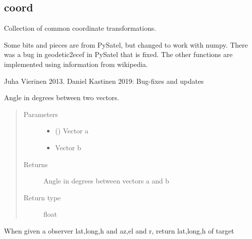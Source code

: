 \documentclass[letterpaper,10pt,english]{sphinxmanual}
\begin{document}
\subsection{coord}
\label{\detokenize{modules/coord:module-coord}}\label{\detokenize{modules/coord:coord}}\label{\detokenize{modules/coord::doc}}
Collection of common coordinate transformations.

Some bits and pieces are from PySatel, but changed to work with numpy.
There was a bug in geodetic2ecef in PySatel that is fixed. The other functions
are implemented using information from wikipedia.

Juha Vierinen 2013.
Daniel Kastinen 2019: Bug-fixes and updates

\begin{fulllineitems}
\label{\detokenize{modules/coord:coord.angle_deg}}
Angle in degrees between two vectors.
\begin{quote}\begin{description}
\item[{Parameters}] \leavevmode\begin{itemize}
\item {} 
 () \textendash{} Vector a

\item {} 
 \textendash{} Vector b

\end{itemize}

\item[{Returns}] \leavevmode
Angle in degrees between vectors a and b

\item[{Return type}] \leavevmode
float

\end{description}\end{quote}

\end{fulllineitems}


\begin{fulllineitems}
\label{\detokenize{modules/coord:coord.az_el_r2geodetic}}
When given a observer lat,long,h and az,el and r, return lat,long,h of target

\end{fulllineitems}
\end{document}
